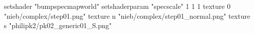 setshader "bumpspecmapworld"
setshaderparam "specscale" 1 1 1
    texture 0 "nieb/complex/step01.png"
    texture n "nieb/complex/step01_normal.png"
    texture s "philipk2/pk02_generic01_S.png"